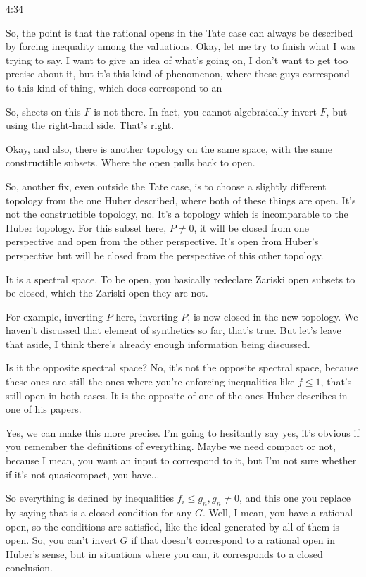 \begin{unfinished}{4:34}
\begin{example}
So, the point is that the rational opens in the Tate case can always be described by forcing inequality among the valuations. Okay, let me try to finish what I was trying to say. I want to give an idea of what's going on, I don't want to get too precise about it, but it's this kind of phenomenon, where these guys correspond to this kind of thing, which does correspond to an

So, sheets on this $F$ is not there. In fact, you cannot algebraically invert $F$, but using the right-hand side. That's right.

Okay, and also, there is another topology on the same space, with the same constructible subsets. Where the open pulls back to open.

So, another fix, even outside the Tate case, is to choose a slightly different topology from the one Huber described, where both of these things are open. It's not the constructible topology, no. It's a topology which is incomparable to the Huber topology. For this subset here, $P \neq 0$, it will be closed from one perspective and open from the other perspective. It's open from Huber's perspective but will be closed from the perspective of this other topology.

It is a spectral space. To be open, you basically redeclare Zariski open subsets to be closed, which the Zariski open they are not.

For example, inverting $P$ here, inverting $P$, is now closed in the new topology. We haven't discussed that element of synthetics so far, that's true. But let's leave that aside, I think there's already enough information being discussed.

Is it the opposite spectral space? No, it's not the opposite spectral space, because these ones are still the ones where you're enforcing inequalities like $f \leq 1$, that's still open in both cases. It is the opposite of one of the ones Huber describes in one of his papers.

Yes, we can make this more precise. I'm going to hesitantly say yes, it's obvious if you remember the definitions of everything. Maybe we need compact or not, because I mean, you want an input to correspond to it, but I'm not sure whether if it's not quasicompact, you have...

So everything is defined by inequalities $f_i \leq g_n, g_n \neq 0$, and this one you replace by saying that is a closed condition for any $G$. Well, I mean, you have a rational open, so the conditions are satisfied, like the ideal generated by all of them is open. So, you can't invert $G$ if that doesn't correspond to a rational open in Huber's sense, but in situations where you can, it corresponds to a closed conclusion.


\end{example}
\end{unfinished}
